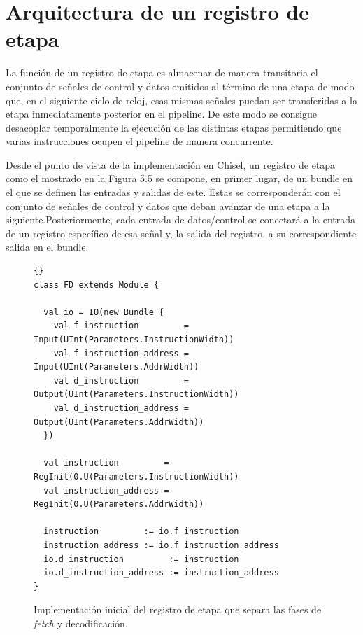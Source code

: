 \section{Arquitectura de un registro de etapa}

La función de un registro de etapa es almacenar de manera transitoria el conjunto de señales de control y datos emitidos al término de una etapa de modo que, en el siguiente ciclo de reloj, esas mismas señales puedan ser transferidas a la etapa inmediatamente posterior en el pipeline. De este modo se consigue desacoplar temporalmente la ejecución de las distintas etapas permitiendo que varias instrucciones ocupen el pipeline de manera concurrente.

Desde el punto de vista de la implementación en Chisel, un registro de etapa como el mostrado en la Figura 5.5 se compone, en primer lugar, de un bundle en el que se definen las entradas y salidas de este. Estas se corresponderán con el conjunto de señales de control y datos que deban avanzar de una etapa a la siguiente.Posteriormente, cada entrada de datos/control se conectará a la entrada de un registro específico de esa señal y, la salida del registro, a su correspondiente salida en el bundle.

\vspace{+0.6cm}
\begin{figure}[h!!]
\begin{lstlisting}[style=scalaStyle,columns=fullflexible]{}
class FD extends Module {

  val io = IO(new Bundle {
    val f_instruction         = Input(UInt(Parameters.InstructionWidth))
    val f_instruction_address = Input(UInt(Parameters.AddrWidth))
    val d_instruction         = Output(UInt(Parameters.InstructionWidth))
    val d_instruction_address = Output(UInt(Parameters.AddrWidth))
  })

  val instruction         = RegInit(0.U(Parameters.InstructionWidth))
  val instruction_address = RegInit(0.U(Parameters.AddrWidth))

  instruction         := io.f_instruction
  instruction_address := io.f_instruction_address
  io.d_instruction         := instruction
  io.d_instruction_address := instruction_address
}
\end{lstlisting}
\vspace{-0.1cm}
\caption{Implementación inicial del registro de etapa que separa las fases de \textit{fetch} y decodificación.}
\end{figure}